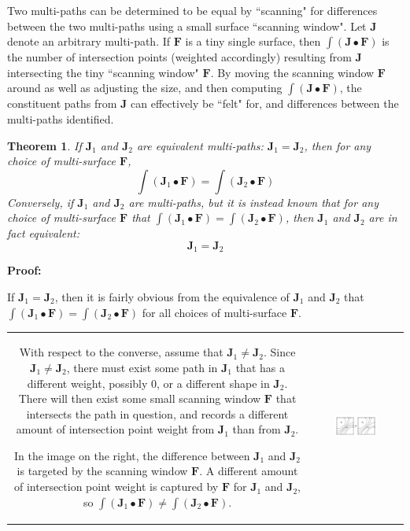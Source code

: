\documentclass{book}
\newtheorem{thm}{Theorem}
\begin{document}
Two multi-paths can be determined to be equal by ``scanning" for differences between the two multi-paths using a small surface ``scanning window". Let \(\mathbf{J}\) denote an arbitrary multi-path. If \(\mathbf{F}\) is a tiny single surface, then \(\int (\mathbf{J} \bullet \mathbf{F})\) is the number of intersection points (weighted accordingly) resulting from \(\mathbf{J}\) intersecting the tiny ``scanning window" \(\mathbf{F}\). By moving the scanning window \(\mathbf{F}\) around as well as adjusting the size, and then computing \(\int (\mathbf{J} \bullet \mathbf{F})\), the constituent paths from \(\mathbf{J}\) can effectively be ``felt" for, and differences between the multi-paths identified.  

\begin{thm}
If \(\mathbf{J}_1\) and \(\mathbf{J}_2\) are equivalent multi-paths: \(\mathbf{J}_1 = \mathbf{J}_2\), then for any choice of multi-surface \(\mathbf{F}\), 
\[\int (\mathbf{J}_1 \bullet \mathbf{F}) = \int (\mathbf{J}_2 \bullet \mathbf{F})\]
Conversely, if \(\mathbf{J}_1\) and \(\mathbf{J}_2\) are multi-paths, but it is instead known that for any choice of multi-surface \(\mathbf{F}\) that 
\(\int (\mathbf{J}_1 \bullet \mathbf{F}) = \int (\mathbf{J}_2 \bullet \mathbf{F})\), then \(\mathbf{J}_1\) and \(\mathbf{J}_2\) are in fact equivalent:
\[\mathbf{J}_1 = \mathbf{J}_2\]  
\end{thm}
\textbf{Proof:}

If \(\mathbf{J}_1 = \mathbf{J}_2\), then it is fairly obvious from the equivalence of \(\mathbf{J}_1\) and \(\mathbf{J}_2\) that \(\int (\mathbf{J}_1 \bullet \mathbf{F}) = \int (\mathbf{J}_2  \bullet \mathbf{F})\) for all choices of multi-surface \(\mathbf{F}\). 

\vspace{5mm}

\begin{tabular}{cc}
\parbox{0.5\textwidth}{
With respect to the converse, assume that \(\mathbf{J}_1 \neq \mathbf{J}_2\). Since \(\mathbf{J}_1 \neq \mathbf{J}_2\), there must exist some path in \(\mathbf{J}_1\) that has a different weight, possibly \(0\), or a different shape in \(\mathbf{J}_2\). There will then exist some small scanning window \(\mathbf{F}\) that intersects the path in question, and records a different amount of intersection point weight from \(\mathbf{J}_1\) than from \(\mathbf{J}_2\).

In the image on the right, the difference between \(\mathbf{J}_1\) and \(\mathbf{J}_2\) is targeted by the scanning window \(\mathbf{F}\). A different amount of intersection point weight is captured by \(\mathbf{F}\) for \(\mathbf{J}_1\) and \(\mathbf{J}_2\), so \(\int (\mathbf{J}_1 \bullet \mathbf{F}) \neq \int (\mathbf{J}_2 \bullet \mathbf{F})\).
} & \parbox{0.5\textwidth}{
\includegraphics[width = 0.5\textwidth]{Point_totals/scanning_paths_using_surfaces}
}
\end{tabular}
\end{document}
